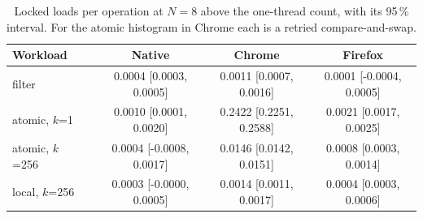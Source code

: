 \begin{table}[htbp]
\caption{Locked loads per operation at $N=8$ above the one-thread count, with its 95\,\% interval. For the atomic histogram in Chrome each is a retried compare-and-swap.}\label{tab:retries}
\centering\small
\begin{tabular}{llccc}
\toprule
Workload &  & Native & Chrome & Firefox \\
\midrule
filter &  & 0.0004 [0.0003, 0.0005] & 0.0011 [0.0007, 0.0016] & 0.0001 [-0.0004, 0.0005] \\
atomic, $k$=1 &  & 0.0010 [0.0001, 0.0020] & 0.2422 [0.2251, 0.2588] & 0.0021 [0.0017, 0.0025] \\
atomic, $k$=256 &  & 0.0004 [-0.0008, 0.0017] & 0.0146 [0.0142, 0.0151] & 0.0008 [0.0003, 0.0014] \\
local, $k$=256 &  & 0.0003 [-0.0000, 0.0005] & 0.0014 [0.0011, 0.0017] & 0.0004 [0.0003, 0.0006] \\
\bottomrule
\end{tabular}
\end{table}
